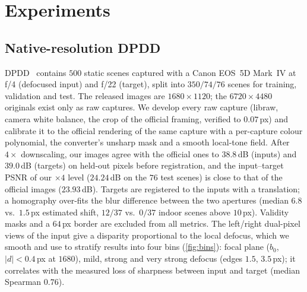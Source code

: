 \section{Experiments}
\label{sec:exp}

\subsection{Native-resolution DPDD}
\label{sec:exp_data}
DPDD~\cite{abuolaim2020dpdd} contains $500$ static scenes captured with a Canon EOS~5D Mark~IV at f/4
(defocused input) and f/22 (target), split into $350/74/76$ scenes for training, validation and test.
The released images are $1680\times1120$; the $6720\times4480$ originals exist only as raw captures. We
develop every raw capture (libraw, camera white balance, the crop of the official framing, verified
to $0.07$\,px) and calibrate it to the official rendering of the same capture with a per-capture
colour polynomial, the converter's unsharp mask and a smooth local-tone field. After $4\times$
downscaling, our images agree with the official ones to $38.8$\,dB (inputs) and $39.0$\,dB (targets)
on held-out pixels before registration, and the input--target PSNR of our $\times4$ level ($24.24$\,dB on the $76$ test
scenes) is close to that of the official images ($23.93$\,dB). Targets are registered to the inputs with a translation; a
homography over-fits the blur difference between the two apertures (median $6.8$ vs.\ $1.5$\,px
estimated shift, $12/37$ vs.\ $0/37$ indoor scenes above $10$\,px). Validity masks and a $64$\,px
border are excluded from all metrics. The left/right dual-pixel views of the input give a disparity
proportional to the local defocus, which we smooth and use to stratify results into four bins (\cref{fig:bins}): focal
plane ($b_0$, $|d|<0.4$\,px at $1680$), mild, strong and very strong defocus (edges $1.5$, $3.5$\,px);
it correlates with the measured loss of sharpness between input and target (median Spearman $0.76$).
